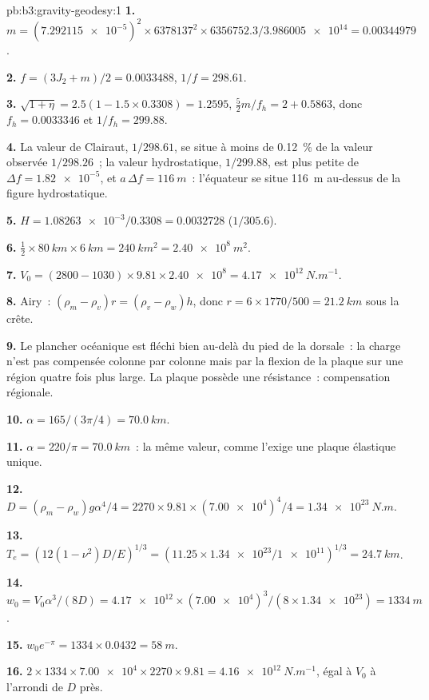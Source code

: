 \begin{solution}{pb:b3:gravity-geodesy:1}
\textbf{1.} $m = (\num{7.292115e-5})^2\times6378137^2\times6356752.3/
\num{3.986005e14} = \num{0.00344979}$.

\textbf{2.} $f = (3J_2 + m)/2 = \num{0.0033488}$, $1/f = 298.61$.

\textbf{3.} $\sqrt{1 + \eta} = 2.5(1 - 1.5\times0.3308) = 1.2595$,
$\tfrac52m/f_h = 2 + 0.5863$, donc $f_h = \num{0.0033346}$ et $1/f_h = 299.88$.

\textbf{4.} La valeur de Clairaut, $1/298.61$, se situe à moins de \qty{0.12}{\percent} de
la valeur observée $1/298.26$~; la valeur hydrostatique, $1/299.88$, est plus petite de
$\Delta f = \num{1.82e-5}$, et $a\,\Delta f = \qty{116}{m}$~: l'équateur se situe
\qty{116}{m} au-dessus de la figure hydrostatique.

\textbf{5.} $H = \num{1.08263e-3}/0.3308 = \num{0.0032728}$ ($1/305.6$).

\textbf{6.} $\tfrac12\times\qty{80}{km}\times\qty{6}{km} = \qty{240}{km^2} =
\qty{2.40e8}{m^2}$.

\textbf{7.} $V_0 = (2800 - 1030)\times9.81\times\num{2.40e8} =
\qty{4.17e12}{N.m^{-1}}$.

\textbf{8.} Airy~: $(\rho_m - \rho_v)r = (\rho_v - \rho_w)h$, donc $r =
6\times1770/500 = \qty{21.2}{km}$ sous la crête.

\textbf{9.} Le plancher océanique est fléchi bien au-delà du pied de la dorsale~: la
charge n'est pas compensée colonne par colonne mais par la flexion de la plaque sur une
région quatre fois plus large. La plaque possède une résistance~: compensation régionale.

\textbf{10.} $\alpha = 165/(3\pi/4) = \qty{70.0}{km}$.

\textbf{11.} $\alpha = 220/\pi = \qty{70.0}{km}$~: la même valeur, comme l'exige une
plaque élastique unique.

\textbf{12.} $D = (\rho_m - \rho_w)g\alpha^4/4 = 2270\times9.81\times(\num{7.00e4})^4/4
= \qty{1.34e23}{N.m}$.

\textbf{13.} $T_e = (12(1 - \nu^2)D/E)^{1/3} = (11.25\times\num{1.34e23}/
\num{1e11})^{1/3} = \qty{24.7}{km}$.

\textbf{14.} $w_0 = V_0\alpha^3/(8D) = \num{4.17e12}\times(\num{7.00e4})^3/
(8\times\num{1.34e23}) = \qty{1334}{m}$.

\textbf{15.} $w_0e^{-\pi} = 1334\times0.0432 = \qty{58}{m}$.

\textbf{16.} $2\times1334\times\num{7.00e4}\times2270\times9.81 =
\qty{4.16e12}{N.m^{-1}}$, égal à $V_0$ à l'arrondi de $D$ près.


\end{solution}

